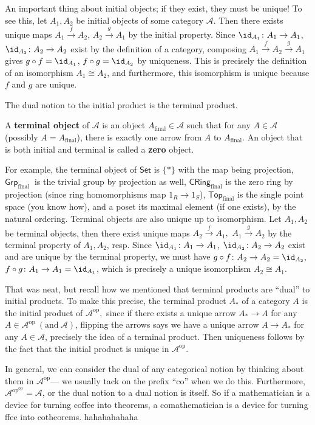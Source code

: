 \begin{remark}
An important thing about initial objects; if they exist, they must be unique! To see this, let $A_1,A_2$ be initial objects of some category $\mathcal{A} .$ Then there exists unique maps $A_1 \overset{f}{\to}  A_2$, $A_2 \overset{g}{\to}  A_1$ by the initial property. Since $\id_{A_1} \colon A_1 \to A_1$, $\id_{A_2}\colon A_2 \to A_2$ exist by the definition of a category, composing $A_1 \overset{f}{\to } A_2 \overset{g}{\to } A_1$ gives $g \circ f=\id_{A_1}$, $f \circ g=\id _{A_2}$ by uniqueness. This is precisely the definition of an isomorphism $A_1 \cong A_2$, and furthermore, this isomorphism is unique because $f$ and $g$ are unique.
\end{remark}
The dual notion to the initial product is the terminal product.
\begin{definition}
    A \textbf{terminal object} of $\mathcal{A} $ is an object $A_{\text{final}}\in \mathcal{A} $ such that for any $A\in \mathcal{A} $ (possibly $A=A_{\text{final}}$), there is exactly one arrow from $A$ to $A_{\text{final}}$. An object that is both initial and terminal is called a \textbf{zero} object.
\end{definition}
For example, the terminal object of $\mathsf{Set} $ is $\{*\} $ with the map being projection, $\mathsf{Grp} _{\text{final }  }$ is the trivial group by projection as well, $\mathsf{CRing}_{\text{final}  } $ is the zero ring by projection (since ring homomorphisms map $1_R \to 1_S$), $\mathsf{Top}_{\text{final}  } $ is the single point space (you know how), and a poset its maximal element (if one exists), by the natural ordering.
    Terminal objects are also unique up to isomorphism. Let $A_1,A_2$ be terminal objects, then there exist unique maps $ A_2 \overset{f}{\to } A_1,$ $A_1 \overset{g}{\to } A_2$ by the terminal property of $A_1,A_2$, resp. Since $\id_{A_1} \colon A_1 \to A_1$, $\id_{A_2} \colon A_2 \to A_2$ exist and are unique by the terminal property, we must have $g \circ f \colon A_2 \to A_2=\id _{A_2},$ $f \circ g \colon A_1 \to A_1=\id _{A_1}$, which is precisely a unique isomorphism $A_2 \cong A_1$.
\begin{remark}
That was neat, but recall how we mentioned that terminal products are ``dual'' to initial products. To make this precise, the terminal product $A_*$ of a category $A$ is the initial product of $\mathcal{A} ^{\mathrm{op}},$ since if there exists a unique arrow $A_{*} \to A$ for any $A \in \mathcal{A} ^{\mathrm{op}} \ (\text{and} \ \mathcal{A} )$, flipping the arrows says we have a unique arrow $A \to A_*$ for any $A \in \mathcal{A} $, precisely the idea of a terminal product. Then uniqueness follows by the fact that the initial product is unique in $\mathcal{A} ^{\mathrm{op}}$.

In general, we can consider the dual of any categorical notion by thinking about them in $\mathcal{A} ^{\mathrm{op}}$--- we usually tack on the prefix ``co'' when we do this. Furthermore, $\mathcal{A} ^{\mathrm{op}^{\mathrm{op}}}=\mathcal{A} $, or the dual notion to a dual notion is itself. So if a mathematician is a device for turning coffee into theorems, a comathematician is a device for turning ffee into cotheorems. hahahahahaha
\end{remark}
